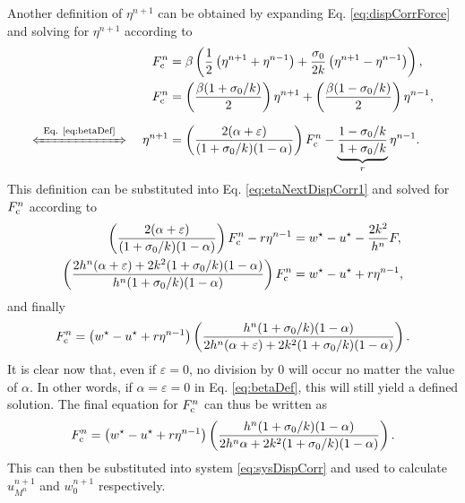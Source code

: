 Another definition of $\eta^{n+1}$ can be obtained by expanding Eq. \eqref{eq:dispCorrForce} and solving for $\eta^{n+1}$ according to
\begin{align}
    F_\ctxt^n &= \beta\left(\frac{1}{2}\left(\eta^{n+1}+\eta^{n-1}\right) + \frac{\sigma_0}{2k}\left(\eta^{n+1}-\eta^{n-1}\right)\right)\nonumber,\\
    F_\ctxt^n&= \left(\frac{\beta (1 + \sigma_0/k)}{2}\right)\eta^{n+1} + \left(\frac{\beta (1 - \sigma_0/k)}{2}\right) \eta^{n-1}\nonumber,\\
    \xLeftrightarrow{\mystrut\ \text{Eq. \eqref{eq:betaDef}}\ } \quad \eta^{n+1} &= \left(\frac{2
    (\alpha +\varepsilon)}{(1+\sigma_0/k)(1-\alpha)}\right)F_\ctxt^n - \underbrace{\frac{1-\sigma_0/k}{1+\sigma_0/k}}_{r}\eta^{n-1}.\label{eq:etaNextDispCorr2}
\end{align}
This definition can be substituted into Eq. \eqref{eq:etaNextDispCorr1} and solved for $F_{\text{c}}^n$ according to 
\begin{align*}
    \left(\frac{2
    (\alpha +\varepsilon)}{(1+\sigma_0/k)(1-\alpha)}\right)F_{\text{c}}^n - r \eta^{n-1} &= w^\star - u^\star- \frac{2k^2}{h^n}F,\\
    \left(\frac{2h^n
    (\alpha +\varepsilon) + 2k^2(1+\sigma_0/k)(1-\alpha)}{h^n(1+\sigma_0/k)(1-\alpha)}\right)F_{\text{c}}^n &= w^\star - u^\star+r\eta^{n-1},
\end{align*}
and finally 
\begin{equation*}
    F_{\text{c}}^n = \left(w^\star - u^\star+r\eta^{n-1}\right)\left(\frac{h^n(1+\sigma_0/k)(1-\alpha)}{2h^n (\alpha +\varepsilon) + 2k^2(1+\sigma_0/k)(1-\alpha)}\right).
\end{equation*}
It is clear now that, even if $\varepsilon = 0$, no division by 0 will occur no matter the value of $\alpha$. In other words, if $\alpha = \varepsilon = 0$ in Eq. \eqref{eq:betaDef}, this will still yield a defined solution. The final equation for $F_{\text{c}}^n$ can thus be written as
\begin{equation}\label{eq:finalForce}
    F_{\text{c}}^n = \left(w^\star - u^\star+r\eta^{n-1}\right)\left(\frac{h^n(1+\sigma_0/k)(1-\alpha)}{2h^n\alpha + 2k^2(1+\sigma_0/k)(1-\alpha)}\right).
\end{equation}
This can then be substituted into system \eqref{eq:sysDispCorr} and used to calculate $u_{M^n}^{n+1}$ and $w_0^{n+1}$ respectively. 

